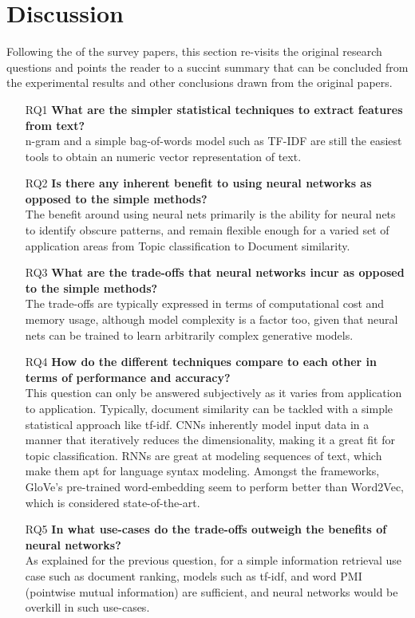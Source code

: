 \documentclass[11pt,a4paper]{article}
\begin{document}
\section{Discussion} %
\label{sec:discussion}

  Following the  of the survey papers, this section re-visits the original research questions and points the reader to a succint summary that can be concluded from the experimental results and other conclusions drawn from the original papers.

  \begin{itemize}
    \item [RQ1] 
    \textbf{What are the simpler statistical techniques to extract features from text?} \\
    n-gram and a simple bag-of-words model such as TF-IDF are still the easiest tools to obtain an numeric vector representation of text.
    \item [RQ2] 
    \textbf{Is there any inherent benefit to using neural networks as opposed to the simple methods?} \\
    The benefit around using neural nets primarily is the ability for neural nets to identify obscure patterns, and remain flexible enough for a varied set of application areas from Topic classification to Document similarity.
    \item [RQ3] 
    \textbf{What are the trade-offs that neural networks incur as opposed to the simple methods?} \\
    The trade-offs are typically expressed in terms of computational cost and memory usage, although model complexity is a factor too, given that neural nets can be trained to learn arbitrarily complex generative models.
    \item [RQ4] 
    \textbf{How do the different techniques compare to each other in terms of performance and accuracy?} \\
    This question can only be answered subjectively as it varies from application to application. Typically, document similarity can be tackled with a simple statistical approach like tf-idf. CNNs inherently model input data in a manner that iteratively reduces the dimensionality, making it a great fit for topic classification. RNNs are great at modeling sequences of text, which make them apt for language syntax modeling. Amongst the frameworks, GloVe's pre-trained word-embedding seem to perform better than Word2Vec, which is considered state-of-the-art.
    \item [RQ5] 
    \textbf{In what use-cases do the trade-offs outweigh the benefits of neural networks?} \\
    As explained for the previous question, for a simple information retrieval use case such as document ranking, models such as tf-idf, and word PMI (pointwise mutual information) are sufficient, and neural networks would be overkill in such use-cases.
  \end{itemize}
\end{document}
